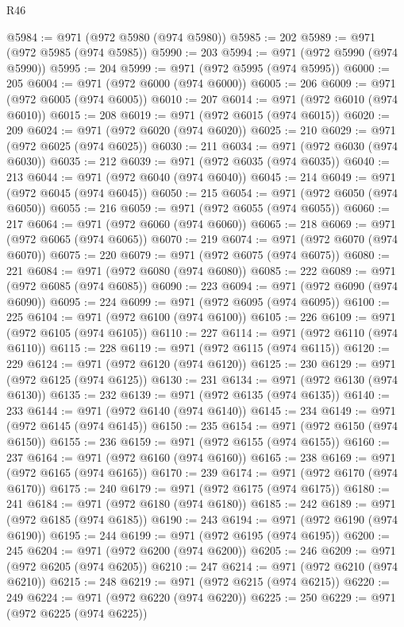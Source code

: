 \begin{lexlean}{R46}
\begin{coremodule}
@5984 := @971 (@972 @5980 (@974 @5980))
@5985 := 202
@5989 := @971 (@972 @5985 (@974 @5985))
@5990 := 203
@5994 := @971 (@972 @5990 (@974 @5990))
@5995 := 204
@5999 := @971 (@972 @5995 (@974 @5995))
@6000 := 205
@6004 := @971 (@972 @6000 (@974 @6000))
@6005 := 206
@6009 := @971 (@972 @6005 (@974 @6005))
@6010 := 207
@6014 := @971 (@972 @6010 (@974 @6010))
@6015 := 208
@6019 := @971 (@972 @6015 (@974 @6015))
@6020 := 209
@6024 := @971 (@972 @6020 (@974 @6020))
@6025 := 210
@6029 := @971 (@972 @6025 (@974 @6025))
@6030 := 211
@6034 := @971 (@972 @6030 (@974 @6030))
@6035 := 212
@6039 := @971 (@972 @6035 (@974 @6035))
@6040 := 213
@6044 := @971 (@972 @6040 (@974 @6040))
@6045 := 214
@6049 := @971 (@972 @6045 (@974 @6045))
@6050 := 215
@6054 := @971 (@972 @6050 (@974 @6050))
@6055 := 216
@6059 := @971 (@972 @6055 (@974 @6055))
@6060 := 217
@6064 := @971 (@972 @6060 (@974 @6060))
@6065 := 218
@6069 := @971 (@972 @6065 (@974 @6065))
@6070 := 219
@6074 := @971 (@972 @6070 (@974 @6070))
@6075 := 220
@6079 := @971 (@972 @6075 (@974 @6075))
@6080 := 221
@6084 := @971 (@972 @6080 (@974 @6080))
@6085 := 222
@6089 := @971 (@972 @6085 (@974 @6085))
@6090 := 223
@6094 := @971 (@972 @6090 (@974 @6090))
@6095 := 224
@6099 := @971 (@972 @6095 (@974 @6095))
@6100 := 225
@6104 := @971 (@972 @6100 (@974 @6100))
@6105 := 226
@6109 := @971 (@972 @6105 (@974 @6105))
@6110 := 227
@6114 := @971 (@972 @6110 (@974 @6110))
@6115 := 228
@6119 := @971 (@972 @6115 (@974 @6115))
@6120 := 229
@6124 := @971 (@972 @6120 (@974 @6120))
@6125 := 230
@6129 := @971 (@972 @6125 (@974 @6125))
@6130 := 231
@6134 := @971 (@972 @6130 (@974 @6130))
@6135 := 232
@6139 := @971 (@972 @6135 (@974 @6135))
@6140 := 233
@6144 := @971 (@972 @6140 (@974 @6140))
@6145 := 234
@6149 := @971 (@972 @6145 (@974 @6145))
@6150 := 235
@6154 := @971 (@972 @6150 (@974 @6150))
@6155 := 236
@6159 := @971 (@972 @6155 (@974 @6155))
@6160 := 237
@6164 := @971 (@972 @6160 (@974 @6160))
@6165 := 238
@6169 := @971 (@972 @6165 (@974 @6165))
@6170 := 239
@6174 := @971 (@972 @6170 (@974 @6170))
@6175 := 240
@6179 := @971 (@972 @6175 (@974 @6175))
@6180 := 241
@6184 := @971 (@972 @6180 (@974 @6180))
@6185 := 242
@6189 := @971 (@972 @6185 (@974 @6185))
@6190 := 243
@6194 := @971 (@972 @6190 (@974 @6190))
@6195 := 244
@6199 := @971 (@972 @6195 (@974 @6195))
@6200 := 245
@6204 := @971 (@972 @6200 (@974 @6200))
@6205 := 246
@6209 := @971 (@972 @6205 (@974 @6205))
@6210 := 247
@6214 := @971 (@972 @6210 (@974 @6210))
@6215 := 248
@6219 := @971 (@972 @6215 (@974 @6215))
@6220 := 249
@6224 := @971 (@972 @6220 (@974 @6220))
@6225 := 250
@6229 := @971 (@972 @6225 (@974 @6225))

\end{coremodule}
\end{lexlean}
